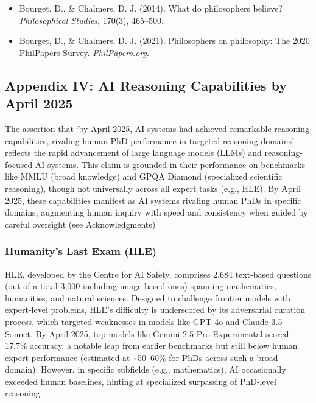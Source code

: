 \begin{itemize}
\tightlist
\item
  Bourget, D., \& Chalmers, D. J. (2014). What do philosophers believe?
  \emph{Philosophical Studies}, 170(3), 465--500.
\item
  Bourget, D., \& Chalmers, D. J. (2021). Philosophers on philosophy:
  The 2020 PhilPapers Survey. \emph{PhilPapers.org}.
\end{itemize}

\subsection{Appendix IV: AI Reasoning Capabilities by April
2025}\label{appendix-iv-ai-reasoning-capabilities-by-april-2025}

The assertion that `by April 2025, AI systems had achieved remarkable
reasoning capabilities, rivaling human PhD performance in targeted
reasoning domains' reflects the rapid advancement of large language
models (LLMs) and reasoning-focused AI systems. This claim is grounded
in their performance on benchmarks like MMLU (broad knowledge) and GPQA
Diamond (specialized scientific reasoning), though not universally
across all expert tasks (e.g., HLE). By April 2025, these capabilities
manifest as AI systems rivaling human PhDs in specific domains,
augmenting human inquiry with speed and consistency when guided by
careful oversight (see Acknowledgments)

\subsubsection{Humanity's Last Exam
(HLE)}\label{humanitys-last-exam-hle}

HLE, developed by the Centre for AI Safety, comprises 2,684 text-based
questions (out of a total 3,000 including image-based ones) spanning
mathematics, humanities, and natural sciences. Designed to challenge
frontier models with expert-level problems, HLE's difficulty is
underscored by its adversarial curation process, which targeted
weaknesses in models like GPT-4o and Claude 3.5 Sonnet. By April 2025,
top models like Gemini 2.5 Pro Experimental scored 17.7\% accuracy, a
notable leap from earlier benchmarks but still below human expert
performance (estimated at \textasciitilde50--60\% for PhDs across such a
broad domain). However, in specific subfields (e.g., mathematics), AI
occasionally exceeded human baselines, hinting at specialized surpassing
of PhD-level reasoning.

